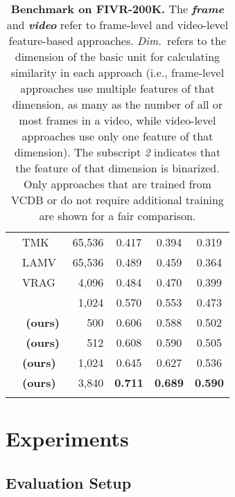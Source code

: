 \documentclass[10pt,twocolumn,letterpaper]{article}
\begin{document}
\begin{table}[!t]
\begin{center}
\begin{tabular}{@{}clrccc@{}}
             & TMK~\cite{poullot2015temporal}  & 65,536 & 0.417 & 0.394 & \multicolumn{1}{c}{0.319} \\ 
             & LAMV~\cite{baraldi2018lamv}  & 65,536 & 0.489 & 0.459 & \multicolumn{1}{c}{0.364} \\
             & VRAG~\cite{ng2022vrag}  & 4,096 & 0.484 & 0.470 & \multicolumn{1}{c}{0.399} \\
             & ~\cite{shao2021temporal}  & 1,024 & 0.570 & 0.553 & \multicolumn{1}{c}{0.473} \\ \cmidrule(l){2-6}
             &  \,\,\textbf{(ours)} & 500 & 0.606 & 0.588 & \multicolumn{1}{c}{0.502} \\
             &  \,\,\textbf{(ours)} & 512 & 0.608 & 0.590 & \multicolumn{1}{c}{0.505} \\
             &  \textbf{(ours)} & 1,024 & 0.645 & 0.627 & \multicolumn{1}{c}{0.536} \\
             &  \textbf{(ours)} & 3,840 & \textbf{0.711} & \textbf{0.689} & \multicolumn{1}{c}{\textbf{0.590}} \\
            \cmidrule[\heavyrulewidth]{1-6}
            \morecmidrules
            \cmidrule[\heavyrulewidth]{1-6} 
            \end{tabular} \vspace{-4mm}
        \caption{\textbf{Benchmark on FIVR-200K.} The \textit{\textbf{frame}} and \textit{\textbf{video}} refer to frame-level and video-level feature-based approaches. \textit{Dim.}~refers to the dimension of the basic unit for calculating similarity in each approach (i.e., frame-level approaches use multiple features of that dimension, as many as the number of all or most frames in a video, while video-level approaches use only one feature of that dimension). The subscript \textit{2} indicates that the feature of that dimension is binarized. Only approaches that are trained from VCDB or do not require additional training are shown for a fair comparison.} \vspace{-7mm} \label{tab:fivr}
        \end{center}
    \end{table}
    
\section{Experiments}\label{exp}
    \subsection{Evaluation Setup}
    
\end{document}
